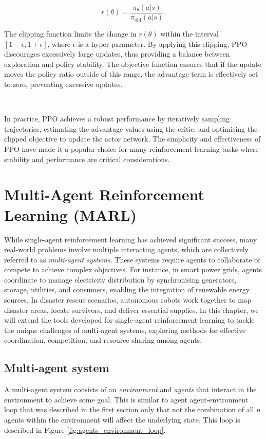 \documentclass{article}
\begin{document}
\begin{equation}
r(\theta) = \frac{\pi_\theta(a|s)}{\pi_\text{old}(a|s)}.
\end{equation}

The clipping function limits the change in $r(\theta)$ within the interval $[1 - \epsilon, 1 + \epsilon]$, where $\epsilon$ is a hyper-parameter. By applying this clipping, PPO discourages excessively large updates, thus providing a balance between exploration and policy stability. The objective function ensures that if the update moves the policy ratio outside of this range, the advantage term is effectively set to zero, preventing excessive updates.

\

In practice, PPO achieves a robust performance by iteratively sampling trajectories, estimating the advantage values using the critic, and optimising the clipped objective to update the actor network. The simplicity and effectiveness of PPO have made it a popular choice for many reinforcement learning tasks where stability and performance are critical considerations.

\section{Multi-Agent Reinforcement Learning (MARL)}

While single-agent reinforcement learning has achieved significant success, many real-world problems involve multiple interacting agents, which are collectively referred to as \textit{multi-agent systems}. These systems require agents to collaborate or compete to achieve complex objectives. For instance, in smart power grids, agents coordinate to manage electricity distribution by synchronising generators, storage, utilities, and consumers, enabling the integration of renewable energy sources. In disaster rescue scenarios, autonomous robots work together to map disaster areas, locate survivors, and deliver essential supplies. In this chapter, we will extend the tools developed for single-agent reinforcement learning to tackle the unique challenges of multi-agent systems, exploring methods for effective coordination, competition, and resource sharing among agents.

\subsection{Multi-agent system}

A multi-agent system consists of an \textit{environment} and \textit{agents} that interact in the environment to achieve some goal. This is similar to agent agent-environment loop that was described in the first section only that not the combination of all $n$ agents within the environment will affect the underlying state. This loop is described in Figure \ref{fig:agents_environment_loop}. 
\end{document}
